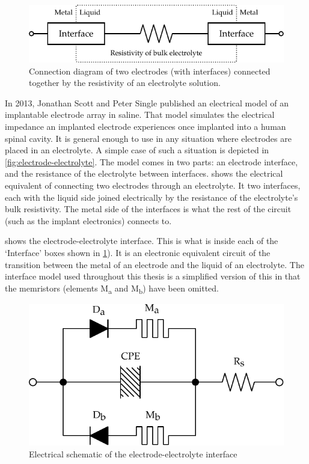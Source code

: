   \begin{figure}
    \centering
    \includegraphics{content/pt2/07-InterfaceModel/graphics/simpleElectrodeElectrolyteModel}
    \caption{\label{fig:pt2-simpleElectrodeElectrolyteModel}Connection diagram of two electrodes (with interfaces) connected together by the resistivity of an electrolyte solution.}
  \end{figure}
  In 2013, Jonathan Scott and Peter Single published an electrical model of an implantable electrode array in saline\cite{ScottSingle2013}.
  That model simulates the electrical impedance an implanted electrode experiences once implanted into a human spinal cavity.
  It is general enough to use in any situation where electrodes are placed in an electrolyte.
  A simple case of such a situation is depicted in \cref{fig:electrode-electrolyte}.
  The model comes in two parts: an electrode interface, and the resistance of the electrolyte between interfaces.
   shows the electrical equivalent of connecting two electrodes through an electrolyte.
  It two interfaces, each with the liquid side joined electrically by the resistance of the electrolyte's bulk resistivity.
  The metal side of the interfaces is what the rest of the circuit (such as the implant electronics) connects to.

   shows the electrode-electrolyte interface.
  This is what is inside each of the `Interface' boxes shown in \cref{fig:pt2-simpleElectrodeElectrolyteModel}).
  It is an electronic equivalent circuit of the transition between the metal of an electrode and the liquid of an electrolyte.
  The interface model used throughout this thesis is a simplified version of this in that the memristors (elements M\textsubscript{a} and M\textsubscript{b}) have been omitted.

  \begin{figure}
    \centering
    \includegraphics{content/pt2/07-InterfaceModel/graphics/interfaceSchematic}
    \caption{\label{fig:pt2-interfaceSchematic}Electrical schematic of the electrode-electrolyte interface}
  \end{figure}

